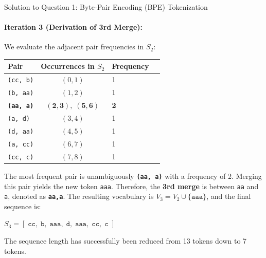 \documentclass[11pt,a4paper]{article}
\begin{document}
\begin{solutionbox}{Solution to Question 1: Byte-Pair Encoding (BPE) Tokenization}
\paragraph{Iteration 3 (Derivation of 3rd Merge):}
We evaluate the adjacent pair frequencies in $S_2$:
\begin{center}
\begin{tabular}{lclc}
\toprule
\textbf{Pair} & \textbf{Occurrences in $S_2$} & \textbf{Frequency} \\
\midrule
\texttt{(cc, b)} & $(0,1)$ & 1 \\
\texttt{(b, aa)} & $(1,2)$ & 1 \\
\textbf{\texttt{(aa, a)}} & $\mathbf{(2,3),\; (5,6)}$ & \textbf{2} \\
\texttt{(a, d)} & $(3,4)$ & 1 \\
\texttt{(d, aa)} & $(4,5)$ & 1 \\
\texttt{(a, cc)} & $(6,7)$ & 1 \\
\texttt{(cc, c)} & $(7,8)$ & 1 \\
\bottomrule
\end{tabular}
\end{center}
The most frequent pair is unambiguously \textbf{\texttt{(aa, a)}} with a frequency of 2.
Merging this pair yields the new token \texttt{aaa}.
Therefore, the \textbf{3rd merge} is between \texttt{aa} and \texttt{a}, denoted as \textbf{\texttt{aa,a}}.
The resulting vocabulary is $V_3 = V_2 \cup \{\texttt{aaa}\}$, and the final sequence is:
\begin{center}
$S_3 = [\;\texttt{cc},\; \texttt{b},\; \texttt{aaa},\; \texttt{d},\; \texttt{aaa},\; \texttt{cc},\; \texttt{c}\;]$
\end{center}
The sequence length has successfully been reduced from 13 tokens down to 7 tokens.
\end{solutionbox}

\vspace{0.4cm}
\end{document}
